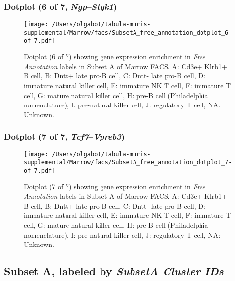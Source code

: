 \clearpage

\subsubsection{Dotplot (6 of 7, \emph{Ngp}--\emph{Styk1})}
\begin{figure}[h]
\centering
\texttt{[image: /Users/olgabot/tabula-muris-supplemental/Marrow/facs/SubsetA\_free\_annotation\_dotplot\_6-of-7.pdf]}

\caption{ Dotplot (6 of 7)  showing gene expression enrichment in \emph{Free Annotation} labels in Subset A of Marrow FACS. A: Cd3e+ Klrb1+ B cell, B: Dntt+ late pro-B cell, C: Dntt- late pro-B cell, D: immature natural killer cell, E: immature NK T cell, F: immature T cell, G: mature natural killer cell, H: pre-B cell (Philadelphia nomenclature), I: pre-natural killer cell, J: regulatory T cell, NA: Unknown.}
\end{figure}


\clearpage

\subsubsection{Dotplot (7 of 7, \emph{Tcf7}--\emph{Vpreb3})}
\begin{figure}[h]
\centering
\texttt{[image: /Users/olgabot/tabula-muris-supplemental/Marrow/facs/SubsetA\_free\_annotation\_dotplot\_7-of-7.pdf]}

\caption{ Dotplot (7 of 7)  showing gene expression enrichment in \emph{Free Annotation} labels in Subset A of Marrow FACS. A: Cd3e+ Klrb1+ B cell, B: Dntt+ late pro-B cell, C: Dntt- late pro-B cell, D: immature natural killer cell, E: immature NK T cell, F: immature T cell, G: mature natural killer cell, H: pre-B cell (Philadelphia nomenclature), I: pre-natural killer cell, J: regulatory T cell, NA: Unknown.}
\end{figure}


\clearpage

\subsection{Subset A, labeled by \emph{SubsetA Cluster IDs}}

